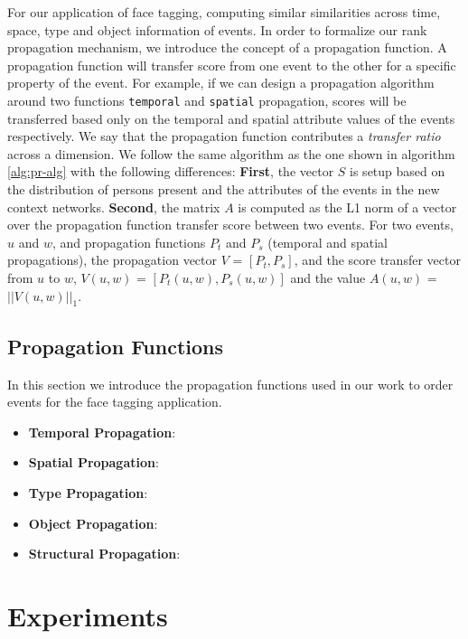 For our application of face tagging, computing similar similarities across time, space, type and object information of events. In order to formalize our rank propagation mechanism, we introduce the concept of a propagation function. A propagation function will transfer score from one event to the other for a specific property of the event. For example, if we can design a propagation algorithm around two functions \texttt{temporal} and \texttt{spatial} propagation, scores will be transferred based only on the temporal and spatial attribute values of the events respectively. We say that the propagation function contributes a \textit{transfer ratio} across a dimension. We follow the same algorithm as the one shown in algorithm \ref{alg:pr-alg} with the following differences: \textbf{First}, the vector $S$ is setup based on the distribution of persons present and the attributes of the events in the new context networks. \textbf{Second}, the matrix $A$ is computed as the L1 norm of a vector over the propagation function transfer score between two events. For two events, $u$ and $w$, and propagation functions $P_t$ and $P_s$ (temporal and spatial propagations), the propagation vector $V$ = $[P_t, P_s]$, and the score transfer vector from $u$ to $w$, $V(u, w)$ = $[P_t(u, w), P_s(u, w)]$ and the value $A(u, w)$ = $||V(u, w)||_1$.

\subsection{Propagation Functions}

In this section we introduce the propagation functions used in our work to order events for the face tagging application.

\begin{itemize}
\item \textbf{Temporal Propagation}:
\item \textbf{Spatial Propagation}:
\item \textbf{Type Propagation}:
\item \textbf{Object Propagation}:
\item \textbf{Structural Propagation}:
\end{itemize}

\section{Experiments}